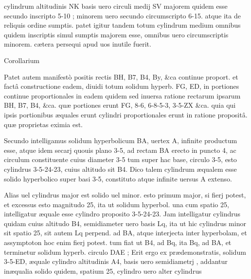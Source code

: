 \documentclass[11pt,a4paper]{article}
\begin{document}

cylindrum altitudinis NK basis uero circuli medij SV majorem quidem esse secundo inscripto 5-10 ; minorem uero secundo circumscripto 6-15. atque ita de reliquis ordine sumptis. patet igitur tandem totum cylindrum medium omnibus quidem inscriptis simul sumptis majorem esse, omnibus uero circumscriptis minorem. cætera persequi apud uos inutile fuerit.

Corollarium

Patet autem manifestò positis rectis BH, B7, B4, By, \&ca continue proport. et factâ constructione eadem, diuidi totum solidum hyperb. FG, ED, in portiones continue proportionales in eadem quidem sed inuersa ratione rectarum ipsarum BH, B7, B4, \&ca. quæ portiones erunt FG, 8-6, 6-8-5-3, 3-5-ZX \&ca. quia qui ipsis portionibus æquales erunt cylindri proportionales erunt in ratione propositâ. quæ proprietas eximia est.

Secundo intelligamus solidum hyperbolicum BA, uertex A, infinite productum esse, atque idem secarj quouis plano 3-5, ad rectam BA erecto in puncto 4, ac circulum constituente cuius diameter 3-5 tum super hac base, circulo 3-5, esto cylindrus 3-5-24-23, cuius altitudo sit B4. Dico talem cylindrum æqualem esse solido hyperbolico super basi 3-5, constituto atque infinite uersus A extenso.

Alias uel cylindrus major est solido uel minor. esto primum major, si fierj potest, et excessus esto magnitudo 25, ita ut solidum hyperbol. una cum spatio 25, intelligatur æquale esse cylindro proposito 3-5-24-23. Jam intelligatur cylindrus quidam cuius altitudo B4, semidiameter uero basis Lq, ita ut hic cylindrus minor sit spatio 25, sit autem Lq perpend. ad BA, atque interjecta inter hyperbolam, et assymptoton hoc enim fierj potest. tum fiat ut B4, ad Bq, ita Bq, ad BA, et terminetur solidum hyperb. circulo DAE ; Erit ergo ex prædemonstratis, solidum 3-5-ED, æquale cylindro altitudinis A4, basis uero semidiametrj , addantur inæqualia solido quidem, spatium 25, cylindro uero alter cylindrus
\end{document}
